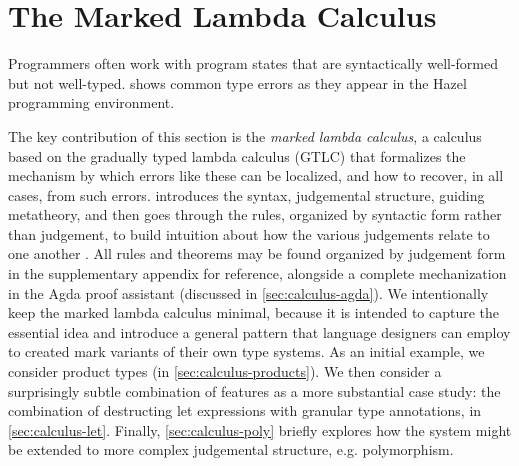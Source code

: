 \section{The Marked Lambda Calculus}
\label{sec:calculus}

Programmers often work with program states that are syntactically well-formed but not well-typed.
 shows common type errors as they appear in the Hazel programming
environment. 




The key contribution of this section is the \emph{marked lambda calculus}, a calculus based on the gradually typed lambda calculus (GTLC) that formalizes the mechanism by which errors like these can be localized, and how to  recover, in all cases, from such errors. 
 introduces the syntax, judgemental structure, guiding metatheory, and then goes through the rules, organized by syntactic form rather than judgement, to build intuition about how the various judgements relate to one another \cite{Siek06a}. All rules and theorems may be found organized by judgement form in the supplementary appendix for reference, 
alongside a complete mechanization in the Agda proof assistant \cite{norell:thesis} (discussed in
\cref{sec:calculus-agda}). We intentionally keep the marked lambda calculus minimal, because it is intended to capture the essential idea and introduce a general pattern that language designers can employ to created mark variants of their own type systems. As an initial example, we consider product types (in \cref{sec:calculus-products}). We then consider a surprisingly subtle combination of features as a more substantial case study: the combination of
destructing let expressions with granular type annotations, in \cref{sec:calculus-let}. Finally, \cref{sec:calculus-poly} briefly explores how
the system might be extended to more complex judgemental structure, e.g. polymorphism.

